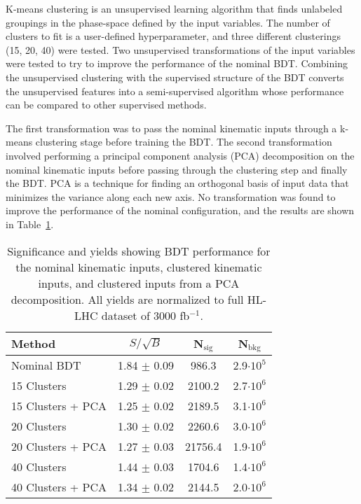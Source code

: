 \label{sec:kmeans}
K-means clustering is an unsupervised learning algorithm that finds unlabeled groupings in the phase-space defined by the input variables. The number of clusters to fit is a user-defined hyperparameter, and three different clusterings (15, 20, 40) were tested. Two unsupervised transformations of the input variables were tested to try to improve the performance of the nominal BDT. Combining the unsupervised clustering with the supervised structure of the BDT converts the unsupervised features into a semi-supervised algorithm whose  performance can be compared to other supervised methods.

The first transformation was to pass the nominal kinematic inputs through a k-means clustering stage before training the BDT. The second transformation involved performing a principal component analysis (PCA) decomposition on the nominal kinematic inputs before passing through the clustering step and finally the BDT. PCA is a technique for finding an orthogonal basis of input data that minimizes the variance along each new axis. No transformation was found to improve the performance of the nominal configuration, and the results are shown in Table~\ref{tab:bdtPCACluster}.

\begin{table}[h!]
\label{tab:bdtPCACluster}
\begin{center}
    \begin{tabular}{|l|c|c|c|} %
      \hline\hline
      \textbf{Method} & $S/\sqrt{B}$ & N$_{\textrm{sig}}$ & N$_{\textrm{bkg}}$ \\
      \hline
      Nominal BDT & 1.84 $\pm$ 0.09 & 986.3  & 2.9$\cdot 10^5$ \\
      15 Clusters & 1.29 $\pm$ 0.02 & 2100.2 & 2.7$\cdot 10^6$ \\
      15 Clusters + PCA & 1.25 $\pm$ 0.02 & 2189.5 & 3.1$\cdot 10^6$ \\         
      20 Clusters & 1.30 $\pm$ 0.02 & 2260.6 & 3.0$\cdot 10^6$ \\
      20 Clusters + PCA & 1.27 $\pm$ 0.03 & 21756.4 & 1.9$\cdot 10^6$ \\         
      40 Clusters & 1.44 $\pm$ 0.03 & 1704.6 & 1.4$\cdot 10^6$ \\
      40 Clusters + PCA & 1.34 $\pm$ 0.02 & 2144.5 & 2.0$\cdot 10^6$ \\         
      \hline\hline
    \end{tabular}
    \caption{Significance and yields showing BDT performance for the nominal kinematic inputs, clustered kinematic inputs, and clustered inputs from a PCA decomposition. All yields are normalized to full HL-LHC dataset of 3000 fb$^{-1}$.}
    \end{center}
\end{table}
